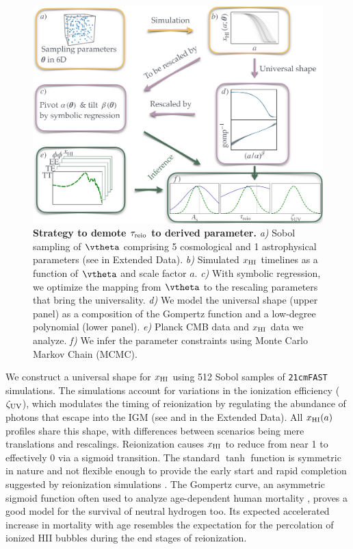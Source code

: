 \begin{figure}[tb]
\centering
\includegraphics[width=\linewidth]{figs/big_fig.pdf}
\caption{\textbf{Strategy to demote $\tau_{\mathrm{reio}}$ to derived parameter.}
\emph{a)} Sobol sampling of $\vtheta$ comprising 5 cosmological and 1
astrophysical parameters (see  in Extended Data).
\emph{b)} Simulated $x_{\mathrm{HI}}$ timelines as a function of $\vtheta$ and
scale factor $a$.
\emph{c)} With symbolic regression, we optimize the mapping from
$\vtheta$ to the rescaling parameters that bring the universality.
\emph{d)} We model the universal shape (upper panel) as a composition of
the Gompertz function and a low-degree polynomial (lower panel).
\emph{e)} Planck CMB data and $x_{\mathrm{HI}}$ data we analyze.
\emph{f)} We infer the parameter constraints using Monte Carlo Markov
Chain (MCMC).}
\label{fig:big}
\end{figure}


We construct a universal shape for $x_{\mathrm{HI}}$ using 512 Sobol 
samples of \texttt{21cmFAST} simulations. 
The simulations account for variations in the ionization efficiency ($\zeta_\mathrm{UV}$), 
which modulates the timing of reionization by regulating the abundance
of photons that escape into the IGM 
(see  and  in the Extended Data). 
All $x_{\mathrm{HI}}(a)$ profiles share this shape, with differences between
scenarios being mere translations and rescalings.
Reionization causes $x_{\mathrm{HI}}$ to reduce from near 1 to effectively 0 via a
sigmoid transition.
The standard $\tanh$ function is symmetric in nature and not flexible
enough to provide the early start and rapid completion suggested by
reionization simulations \cite{Trac2018, Doussot2019}.
The Gompertz curve, an asymmetric sigmoid function often used to analyze
age-dependent human mortality \cite{Gompertz1825}, proves a good model
for the survival of neutral hydrogen too.
Its expected accelerated increase in mortality with age resembles the
expectation for the percolation of ionized HII bubbles during the end
stages of reionization.

